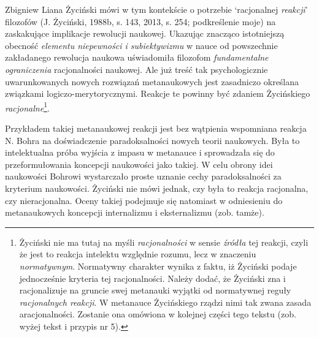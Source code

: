 \begin{artplenv}{Zbigniew Liana}
Życiński mówi w tym kontekście o potrzebie `racjonalnej \textit{reakcji}' filozofów \label{ref:RNDTgN8tnj5Jz}(J. Życiński,
1988b, s. 143, 2013, s. 254; podkreślenie moje) na zaskakujące implikacje rewolucji naukowej. Ukazując znacząco
istotniejszą obecność \textit{elementu niepewności i subiektywizmu} w nauce od powszechnie zakładanego rewolucja naukowa
uświadomiła filozofom \textit{fundamentalne ograniczenia} racjonalności naukowej. Ale już treść tak psychologicznie
uwarunkowanych nowych rozwiązań metanaukowych jest zasadniczo określana związkami logiczo-merytorycznymi. Reakcje te
powinny być zdaniem Życińskiego \textit{racjonalne}\footnote{Życiński nie ma tutaj na myśli \textit{racjonalności} w sensie
\textit{źródła} tej reakcji, czyli że jest to reakcja intelektu względnie rozumu, lecz w znaczeniu \textit{normatywnym}.
Normatywny charakter wynika z faktu, iż Życiński podaje jednocześnie kryteria tej racjonalności. Należy dodać, że
Życiński zna i racjonalizuje na gruncie swej metanauki wyjątki od normatywnej reguły \textit{racjonalnych reakcji}. W metanauce
Życińskiego rządzi nimi tak zwana zasada aracjonalności. Zostanie ona omówiona w kolejnej części tego tekstu
(zob. wyżej tekst i przypis nr 5).}.

Przykładem takiej metanaukowej reakcji jest bez wątpienia wspomniana reakcja N. Bohra na doświadczenie paradoksalności
nowych teorii naukowych. Była to intelektualna próba wyjścia z impasu w metanauce i sprowadzała się do przeformułowania
koncepcji naukowości jako takiej. W celu obrony idei naukowości Bohrowi wystarczało proste uznanie cechy
paradoksalności za kryterium naukowości. Życiński nie mówi jednak, czy była to reakcja racjonalna, czy nieracjonalna.
Oceny takiej podejmuje się natomiast w odniesieniu do metanaukowych koncepcji internalizmu i eksternalizmu (zob.
tamże).


\end{artplenv}

